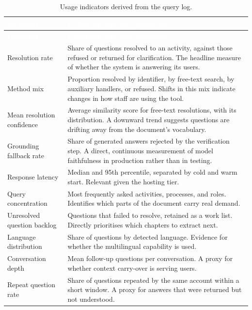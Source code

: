 \begin{longtable}{|p{}|p{}|}
\caption{Usage indicators derived from the query log.}\label{tab:usagekpi}\\
\hline
\rowcolor{myblue}\textcolor{white}{\textbf{Indicator}} & \textcolor{white}{\textbf{Definition and interpretation}} \\
\hline
\endfirsthead
\hline
\rowcolor{myblue}\textcolor{white}{\textbf{Indicator}} & \textcolor{white}{\textbf{Definition and interpretation}} \\
\hline
\endhead
Resolution rate & Share of questions resolved to an activity, against those refused or returned for clarification. The headline measure of whether the system is answering its users. \\ \hline
Method mix & Proportion resolved by identifier, by free-text search, by auxiliary handlers, or refused. Shifts in this mix indicate changes in how staff are using the tool. \\ \hline
Mean resolution confidence & Average similarity score for free-text resolutions, with its distribution. A downward trend suggests questions are drifting away from the document's vocabulary. \\ \hline
Grounding fallback rate & Share of generated answers rejected by the verification step. A direct, continuous measurement of model faithfulness in production rather than in testing. \\ \hline
Response latency & Median and 95th percentile, separated by cold and warm start. Relevant given the hosting tier. \\ \hline
Query concentration & Most frequently asked activities, processes, and roles. Identifies which parts of the document carry real demand. \\ \hline
Unresolved question backlog & Questions that failed to resolve, retained as a work list. Directly prioritises which chapters to extract next. \\ \hline
Language distribution & Share of questions by detected language. Evidence for whether the multilingual capability is used. \\ \hline
Conversation depth & Mean follow-up questions per conversation. A proxy for whether context carry-over is serving users. \\ \hline
Repeat question rate & Share of questions repeated by the same account within a short window. A proxy for answers that were returned but not understood. \\ \hline
\end{longtable}

